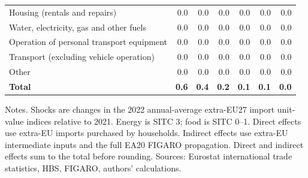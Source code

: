 \begin{table}[H]
{\begin{tabular}[t]{lrrrrrr}
Housing (rentals and repairs) & 0.0 & 0.0 & 0.0 & 0.0 & 0.0 & 0.0\\
Water, electricity, gas and other fuels & 0.0 & 0.0 & 0.0 & 0.0 & 0.0 & 0.0\\
Operation of personal transport equipment & 0.0 & 0.0 & 0.0 & 0.0 & 0.0 & 0.0\\
Transport (excluding vehicle operation) & 0.0 & 0.0 & 0.0 & 0.0 & 0.0 & 0.0\\
Other & 0.0 & 0.0 & 0.0 & 0.0 & 0.0 & 0.0\\
\textbf{Total} & \textbf{0.6} & \textbf{0.4} & \textbf{0.2} & \textbf{0.1} & \textbf{0.1} & \textbf{0.0}\\
\bottomrule
\end{tabular}
}%
\par\vspace{0.35em}\footnotesize\noindent Notes. Shocks are changes in the 2022 annual-average extra-EU27 import unit-value indices relative to 2021. Energy is SITC 3; food is SITC 0--1. Direct effects use extra-EU imports purchased by households. Indirect effects use extra-EU intermediate inputs and the full EA20 FIGARO propagation. Direct and indirect effects sum to the total before rounding. Sources: Eurostat international trade statistics, HBS, FIGARO, authors' calculations.
\end{table}
